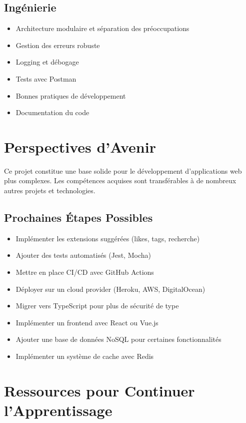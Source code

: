 \subsection{Ingénierie}

\begin{itemize}
    \item Architecture modulaire et séparation des préoccupations
    \item Gestion des erreurs robuste
    \item Logging et débogage
    \item Tests avec Postman
    \item Bonnes pratiques de développement
    \item Documentation du code
\end{itemize}

\section{Perspectives d'Avenir}

Ce projet constitue une base solide pour le développement d'applications web plus complexes. Les compétences acquises sont transférables à de nombreux autres projets et technologies.

\subsection{Prochaines Étapes Possibles}

\begin{itemize}
    \item Implémenter les extensions suggérées (likes, tags, recherche)
    \item Ajouter des tests automatisés (Jest, Mocha)
    \item Mettre en place CI/CD avec GitHub Actions
    \item Déployer sur un cloud provider (Heroku, AWS, DigitalOcean)
    \item Migrer vers TypeScript pour plus de sécurité de type
    \item Implémenter un frontend avec React ou Vue.js
    \item Ajouter une base de données NoSQL pour certaines fonctionnalités
    \item Implémenter un système de cache avec Redis
\end{itemize}

\section{Ressources pour Continuer l'Apprentissage}

